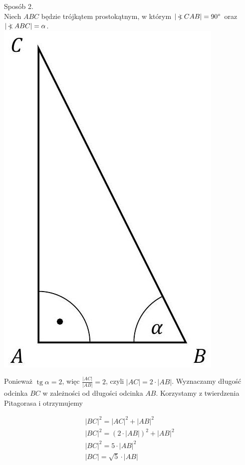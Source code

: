 \documentclass[10pt]{article}
\newcommand\Varangle{\mathop{{<\!\!\!\!\!\text{\small)}}\:}\nolimits}
\begin{document}
Sposób 2.\\
Niech $A B C$ będzie trójkątem prostokątnym, w którym $|\Varangle C A B|=90^{\circ}$ oraz $|\Varangle A B C|=\alpha$.\\
\includegraphics[max width=\textwidth, center]{2025_02_07_191ba7668814b12476d0g-20}

Ponieważ $\operatorname{tg} \alpha=2$, więc $\frac{|A C|}{|A B|}=2$, czyli $|A C|=2 \cdot|A B|$. Wyznaczamy długość odcinka $B C$ w zależności od długości odcinka $A B$. Korzystamy z twierdzenia Pitagorasa i otrzymujemy

$$
\begin{gathered}
|B C|^{2}=|A C|^{2}+|A B|^{2} \\
|B C|^{2}=(2 \cdot|A B|)^{2}+|A B|^{2} \\
|B C|^{2}=5 \cdot|A B|^{2} \\
|B C|=\sqrt{5} \cdot|A B|
\end{gathered}
$$
\end{document}
